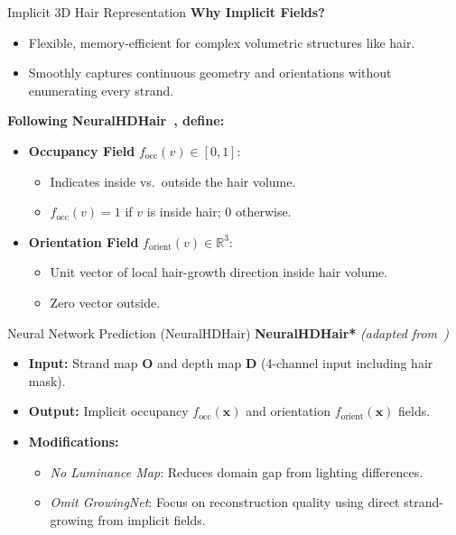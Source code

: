 \begin{frame}[t]{Implicit 3D Hair Representation}
    \textbf{Why Implicit Fields?}
    \begin{itemize}
        \item Flexible, memory-efficient for complex volumetric structures like hair.
        \item Smoothly captures continuous geometry and orientations without enumerating every strand.
    \end{itemize}

    \textbf{Following NeuralHDHair~\cite{wu2022neuralhdhair}, define:}
    \begin{itemize}
        \item \textbf{Occupancy Field} $f_{\text{occ}}(v) \in [0,1]$:
        \begin{itemize}
            \item Indicates inside vs.\ outside the hair volume.
            \item $f_{\text{occ}}(v) = 1$ if $v$ is inside hair; $0$ otherwise.
        \end{itemize}
        \item \textbf{Orientation Field} $f_{\text{orient}}(v) \in \mathbb{R}^3$:
        \begin{itemize}
            \item Unit vector of local hair-growth direction inside hair volume.
            \item Zero vector outside.
        \end{itemize}
    \end{itemize}
\end{frame}

\begin{frame}[t]{Neural Network Prediction (NeuralHDHair)}
    \textbf{NeuralHDHair*} \emph{(adapted from~\cite{wu2022neuralhdhair})}
    \begin{itemize}
        \item \textbf{Input:} Strand map $\mathbf{O}$ and depth map $\mathbf{D}$ (4-channel input including hair mask).
        \item \textbf{Output:} Implicit occupancy $f_{\text{occ}}(\mathbf{x})$ and orientation $f_{\text{orient}}(\mathbf{x})$ fields.
        \item \textbf{Modifications:}
        \begin{itemize}
            \item \emph{No Luminance Map}: Reduces domain gap from lighting differences.
            \item \emph{Omit GrowingNet}: Focus on reconstruction quality using direct strand-growing from implicit fields.
        \end{itemize}
    \end{itemize}
\end{frame}

